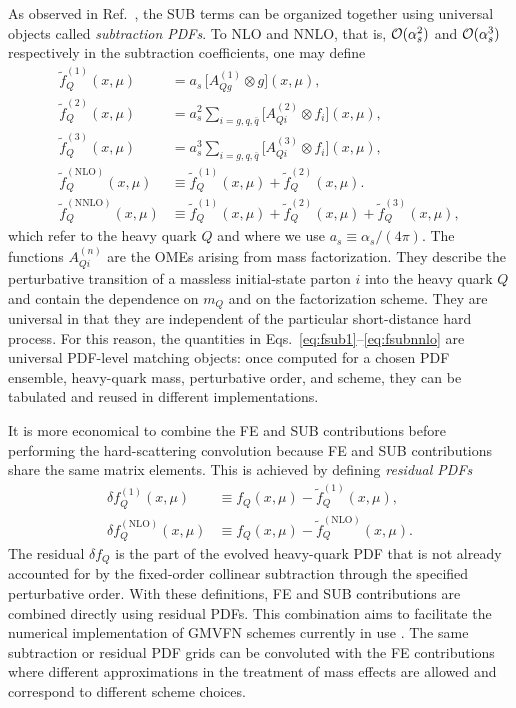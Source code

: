 \documentclass[preprint,12pt]{elsarticle}
\newcommand{\as}{a_s}
\newcommand{\fsub}{\widetilde f}
\newcommand{\df}{\delta f}
\newcommand{\ot}{\otimes}
\newcommand{\NLO}{\mathrm{NLO}}
\begin{document}
As observed in Ref.~\cite{Guzzi:2024can}, the SUB terms can be organized together using universal objects called \emph{subtraction PDFs}. To NLO and NNLO, that is, ${\cal O}(\alpha_s^2)$ and ${\cal O}(\alpha_s^3)$ respectively in the subtraction
coefficients, one may define
\begin{align}
\fsub_Q^{(1)}(x,\mu)
&= \as\,\bigl[A_{Qg}^{(1)} \ot g\bigr](x,\mu),
\label{eq:fsub1}
\\
\fsub_Q^{(2)}(x,\mu)
&= \as^2\sum_{i=g,q,\bar q}
\bigl[A_{Qi}^{(2)} \ot f_i\bigr](x,\mu),
\\
\fsub_Q^{(3)}(x,\mu)
&= \as^3\sum_{i=g, q,\bar q}
\bigl[A_{Qi}^{(3)} \ot f_i\bigr](x,\mu),
\label{eq:fsub2}
\\
\fsub_Q^{(\NLO)}(x,\mu)
&\equiv \fsub_Q^{(1)}(x,\mu)+\fsub_Q^{(2)}(x,\mu).
\label{eq:fsubnlo}
\\
\fsub_Q^{(\textrm{NNLO})}(x,\mu)
&\equiv \fsub_Q^{(1)}(x,\mu)+\fsub_Q^{(2)}(x,\mu)+\fsub_Q^{(3)}(x,\mu),
\label{eq:fsubnnlo}
\end{align}
which refer to the heavy quark $Q$ and where we use $a_s\equiv\alpha_s/(4\pi)$.
The functions $A_{Qi}^{(n)}$ are the  OMEs arising from mass factorization. They describe the perturbative transition of a massless
initial-state parton $i$ into the heavy quark $Q$ and contain the dependence on
$m_Q$ and on the factorization scheme. They are universal in that they are independent of the
particular short-distance hard process. For this reason, the quantities in
Eqs.~\eqref{eq:fsub1}--\eqref{eq:fsubnnlo} are universal PDF-level matching
objects: once computed for a chosen PDF ensemble, heavy-quark mass, perturbative
order, and scheme, they can be tabulated and reused in different implementations.

It is more economical to combine the FE and SUB contributions before performing the hard-scattering convolution because FE and SUB contributions share the same matrix elements. This is
achieved by defining \emph{residual PDFs}
\begin{align}
  \df_Q^{(1)}(x,\mu)
  &\equiv f_Q(x,\mu)-\fsub_Q^{(1)}(x,\mu),
  \label{eq:res1}
  \\
  \df_Q^{(\NLO)}(x,\mu)
  &\equiv f_Q(x,\mu)-\fsub_Q^{(\NLO)}(x,\mu).
  \label{eq:resnlo}
\end{align}
The residual $\df_Q$ is the part of the evolved heavy-quark PDF that is not already accounted for by the fixed-order collinear subtraction through the specified perturbative order.  With these definitions,  
FE and SUB contributions are combined directly using residual
PDFs. This combination aims to facilitate the numerical implementation of GMVFN schemes currently in use \cite{Aivazis:1993kh,Aivazis:1993pi,Tung:2001mv,Kramer:2000hn,Guzzi:2011ew,Guzzi:2024can,Buza:1996wv,Thorne:1997ga,Thorne:2006qt,Cacciari:1998it,Forte:2010ta,Bonvini:2015pxa,Bonvini:2016fgf}. The same subtraction or residual PDF grids can be convoluted with the FE contributions where different approximations in the treatment of mass effects are allowed and correspond to different scheme choices.
\end{document}
